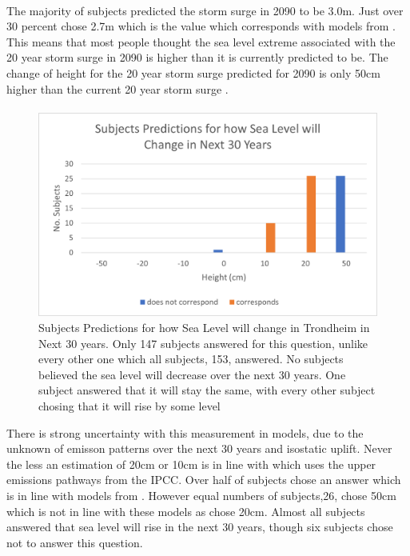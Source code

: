 \paragraph{}
The majority of subjects predicted the storm surge in 2090 to be 3.0m. Just over 30 percent chose 2.7m which is the value which corresponds with models from \cite{kartverket_se_2021}. This means that most people thought the sea level extreme associated with the 20 year storm surge in 2090 is higher than it is currently predicted to be. The change of height for the 20 year storm surge predicted for 2090 is only 50cm higher than the current 20 year storm surge \cite{kartverket_se_2021}. 
\paragraph{}

\begin{figure}[h]
    \centering
    \includegraphics{fig_results/slr-future.png}
    \caption{Subjects Predictions for how Sea Level will change in Trondheim in Next 30 years. Only 147 subjects answered for this question, unlike every other one which all subjects, 153, answered. No subjects believed the sea level will decrease over the next 30 years. One subject answered that it will stay the same, with every other subject chosing that it will rise by some level }
    \label{fig:my_label}
\end{figure}

There is strong uncertainty with this measurement in models, due to the unknown of emisson patterns over the next 30 years and isostatic uplift. Never the less an estimation of 20cm or 10cm is in line with \cite{kartverket_se_2021} which uses the upper emissions pathways from the IPCC. Over half of subjects chose an answer which is in line with models from \cite{kartverket_se_2021}. However equal numbers of subjects,26, chose 50cm which is not in line with these models as chose 20cm. Almost all subjects answered that sea level will rise in the next 30 years, though six subjects chose not to answer this question.  

